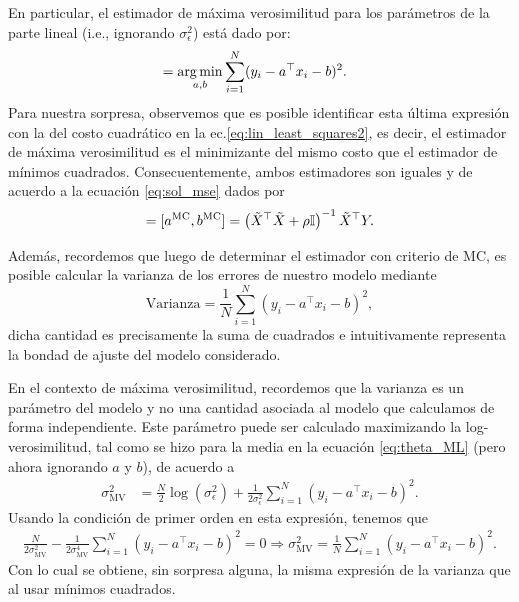En particular, el estimador  de máxima verosimilitud para los parámetros de  la parte lineal (i.e., ignorando $\sigma^2_\epsilon$) está dado por:
\begin{align}
	[a^{\text{MV}} ,b^{\text{MV}} ]
						&= \argmin_{a,b} \sum_{i=1}^N (y_i-a^\top x_i - b)^2. \label{eq:theta_ML}
\end{align}
Para  nuestra  sorpresa, observemos que es posible identificar esta última expresión con la del costo cuadrático en la ec.\eqref{eq:lin_least_squares2}, es decir, el estimador de máxima verosimilitud es el minimizante del mismo costo que el estimador de mínimos cuadrados. Consecuentemente, ambos estimadores son iguales y de acuerdo a la ecuación \eqref{eq:sol_mse} dados por 
\begin{equation}
	[a^{\text{MV}} ,b^{\text{MV}} ]=[a^{\text{MC}} ,b^{\text{MC}} ] = \left(\tX^\top\tX +\rho \eye\right)^{-1} \tX^\top Y.
\end{equation}

Además, recordemos que luego de determinar el estimador con criterio de MC, es posible calcular la varianza de los errores de nuestro modelo mediante 
\begin{equation}
	\text{Varianza} = \frac{1}{N}\sum_{i=1}^N (y_i-a^\top x_i -b)^2,
\end{equation}
dicha cantidad es precisamente la suma de cuadrados e intuitivamente representa la bondad de ajuste del modelo considerado. 

En el contexto de máxima verosimilitud, recordemos que la varianza es un parámetro del modelo y no una cantidad asociada al modelo que calculamos de forma independiente. Este parámetro puede ser calculado maximizando la log-verosimilitud, tal como se hizo para la media en la ecuación \eqref{eq:theta_ML} (pero ahora ignorando $a$ y $b$), de acuerdo a
\begin{align}
	\sigma^2_{\text{MV}} &= \frac{N}{2} \log(\sigma_\epsilon^{2}) + \frac{1}{2\sigma_\epsilon^2}\sum_{i=1}^N {(y_i-a^\top x_i -b)^2}. \label{eq:sigma_ML}
\end{align}
Usando la condición de primer orden en esta expresión, tenemos que
\begin{align}
	\frac{N}{2\sigma^2_{\text{MV}}} - \frac{1}{2\sigma^4_{\text{MV}}}\sum_{i=1}^N {(y_i-a^\top x_i -b)^2} = 0 \Rightarrow \sigma^2_{\text{MV}} = \frac{1}{N}\sum_{i=1}^N {(y_i-a^\top x_i -b)^2}.
\end{align}
Con lo cual se obtiene, sin sorpresa alguna, la misma expresión de la varianza que al usar mínimos cuadrados. 

